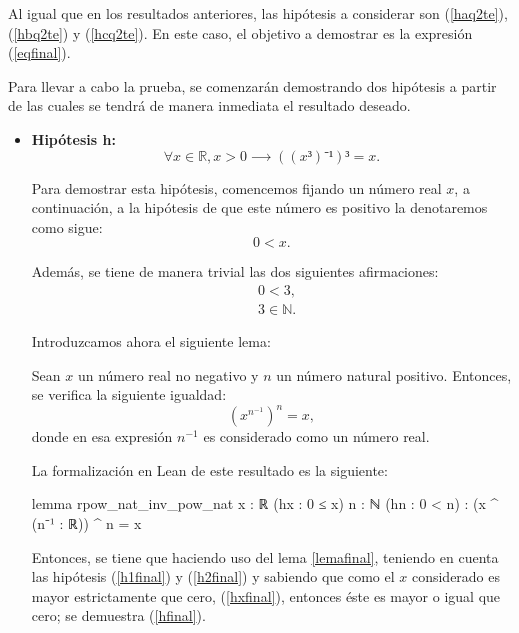 \begin{demostracion}
  Al igual que en los resultados anteriores, las hipótesis a considerar son
  (\ref{haq2te}), (\ref{hbq2te}) y (\ref{hcq2te}). En este caso, el
  objetivo a demostrar es la expresión (\ref{eqfinal}).

  Para llevar a cabo la prueba, se comenzarán demostrando dos hipótesis
  a partir de las cuales se tendrá de manera inmediata el resultado
  deseado.
  \begin{itemize}
  \item \textbf{Hipótesis h:}
    \begin{equation}\label{hfinal}\tag{h}
      ∀x ∈ ℝ, x > 0 ⟶((x³)⁻¹)³ = x.
    \end{equation}

    Para demostrar esta hipótesis, comencemos fijando un número real \(x\),
    a continuación, a la hipótesis de que este número es positivo la
    denotaremos como sigue:
    \begin{equation}\label{hxfinal}\tag{hx}
      0 < x.
    \end{equation}

    Además, se tiene de manera trivial las dos siguientes afirmaciones:
    \begin{align}
      &0 < 3,\label{h1final}\tag{h1}\\
      &3 ∈ ℕ. \label{h2final}\tag{h2}
    \end{align}

    Introduzcamos ahora el siguiente lema:
    \begin{lema}\label{lemafinal}
      Sean \(x\) un número real no negativo y \(n\) un número natural
      positivo. Entonces, se verifica la siguiente igualdad:
      \begin{equation}
        (x^{n^{-1}})^n = x,
      \end{equation}
      donde en esa expresión \(n^{-1} \) es considerado como un número
      real.
    \end{lema}

    La formalización en Lean de este resultado es la siguiente:
    \begin{leancode}
      lemma rpow_nat_inv_pow_nat {x : ℝ} (hx : 0 ≤ x) {n : ℕ} (hn : 0 < n) :
      (x ^ (n⁻¹ : ℝ)) ^ n = x
    \end{leancode}

    Entonces, se tiene que haciendo uso del lema \ref{lemafinal}, teniendo
    en cuenta las hipótesis (\ref{h1final}) y (\ref{h2final}) y sabiendo
    que como el \(x\) considerado es mayor estrictamente que cero,
    (\ref{hxfinal}), entonces éste es mayor o igual que cero; se demuestra
    (\ref{hfinal}).


\end{itemize}
\end{demostracion}
